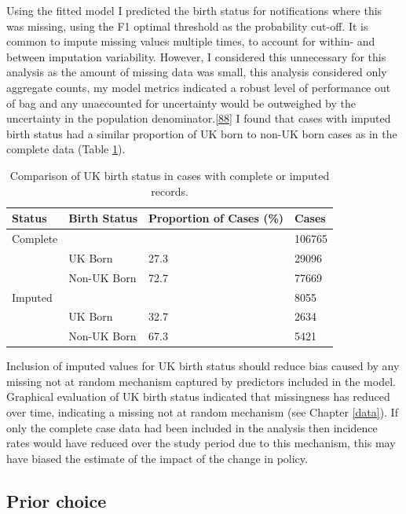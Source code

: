 \documentclass[11pt,twoside]{bristolthesis}
\begin{document}
  Using the fitted model I predicted the birth status for notifications where this was missing, using the F1 optimal threshold as the probability cut-off. It is common to impute missing values multiple times, to account for within- and between imputation variability. However, I considered this unnecessary for this analysis as the amount of missing data was small, this analysis considered only aggregate counts, my model metrics indicated a robust level of performance out of bag and any unaccounted for uncertainty would be outweighed by the uncertainty in the population denominator.{[}\protect\hyperlink{ref-Thomas2018}{88}{]} I found that cases with imputed birth status had a similar proportion of UK born to non-UK born cases as in the complete data (Table \ref{tab:07-imp-com}).
  \begin{table}[!h]
  
  \caption{\label{tab:07-imp-com}Comparison of UK birth status in cases with complete or imputed records.}
  \centering
  \begin{tabular}{llll}
  \toprule
  Status & Birth Status & Proportion of Cases (\%) & Cases\\
  \midrule
  Complete &  &  & 106765\\
   & UK Born & 27.3 & 29096\\
   & Non-UK Born & 72.7 & 77669\\
  Imputed &  &  & 8055\\
   & UK Born & 32.7 & 2634\\
  \addlinespace
   & Non-UK Born & 67.3 & 5421\\
  \bottomrule
  \end{tabular}
  \end{table}
  Inclusion of imputed values for UK birth status should reduce bias caused by any missing not at random mechanism captured by predictors included in the model. Graphical evaluation of UK birth status indicated that missingness has reduced over time, indicating a missing not at random mechanism (see Chapter \ref{data}). If only the complete case data had been included in the analysis then incidence rates would have reduced over the study period due to this mechanism, this may have biased the estimate of the impact of the change in policy.
  
  \hypertarget{prior-choice}{%
  \subsection{Prior choice}\label{prior-choice}}
  
\end{document}
